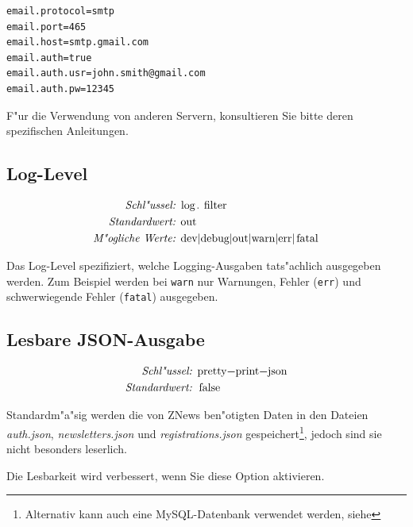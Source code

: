    \begin{lstlisting}[]%@formatter:off
email.protocol=smtp
email.port=465
email.host=smtp.gmail.com
email.auth=true
email.auth.usr=john.smith@gmail.com
email.auth.pw=12345
    \end{lstlisting}%

    F"ur die Verwendung von anderen Servern, konsultieren Sie
    bitte deren spezifischen Anleitungen.

    \subsection{Log-Level}

    \begin{align*}
        \emph{Schl"ussel: } & \lstinline{log.filter}\\
        \emph{Standardwert: } & \lstinline{out}\\
        \emph{M"ogliche Werte: } & \lstinline{dev|debug|out|warn|err|fatal}
    \end{align*}

    Das Log-Level spezifiziert, welche Logging-Ausgaben tats"achlich
    ausgegeben werden. Zum Beispiel werden bei \lstinline{warn}
    nur Warnungen, Fehler (\lstinline{err}) und schwerwiegende Fehler
    (\lstinline{fatal}) ausgegeben.

    \subsection{Lesbare JSON-Ausgabe}

    \begin{align*}
        \emph{Schl"ussel: } & \lstinline{pretty-print-json}\\
        \emph{Standardwert: } & \lstinline{false}
    \end{align*}

    Standardm"a"sig werden die von ZNews ben"otigten Daten
    in den Dateien \emph{auth.json}, \emph{newsletters.json} und \emph{registrations.json}
    gespeichert\footnote{%
    Alternativ kann auch eine MySQL-Datenbank verwendet werden, siehe %
    }, jedoch sind sie nicht besonders leserlich.

    Die Lesbarkeit wird verbessert, wenn Sie diese Option aktivieren.




